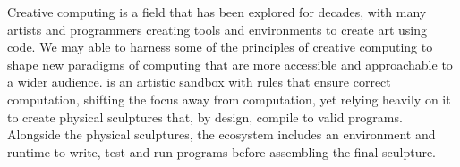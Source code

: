 Creative computing is a field that has been explored for decades, with many artists and programmers creating tools and environments to create art using code.
We may able to harness some of the principles of creative computing to shape new paradigms of computing that are more accessible and approachable to a wider audience.
\sculpt is an artistic sandbox with rules that ensure correct computation, shifting the focus away from computation, yet relying heavily on it to create physical sculptures that, by design, compile to valid programs.
Alongside the physical sculptures, the \sculpt ecosystem includes an environment and runtime to write, test and run programs before assembling the final sculpture.

\endinput